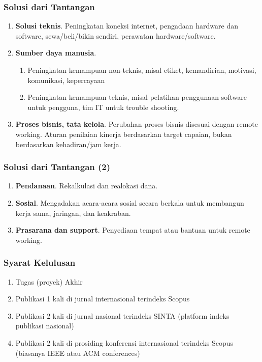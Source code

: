 \documentclass[aspectratio=169, table]{beamer}
\begin{document}
	\begin{frame}
		\frametitle{Solusi dari Tantangan}
		\begin{enumerate}
			\item \textbf{Solusi teknis}. Peningkatan koneksi internet, pengadaan hardware dan software, sewa/beli/bikin sendiri, perawatan hardware/software.
			\item \textbf{Sumber daya manusia}.
			\begin{enumerate}
				\item Peningkatan kemampuan non-teknis, misal etiket, kemandirian, motivasi, komunikasi, kepercayaan
				\item Peningkatan kemampuan teknis, misal pelatihan penggunaan software untuk pengguna, tim IT untuk trouble shooting.
			\end{enumerate}
			\item \textbf{Proses bisnis, tata kelola}. Perubahan proses bisnis disesuai dengan remote working. Aturan penilaian kinerja berdasarkan target capaian, bukan berdasarkan kehadiran/jam kerja.
		\end{enumerate}
	\end{frame}

	\begin{frame}
		\frametitle{Solusi dari Tantangan (2)}
		\begin{enumerate}
			\item \textbf{Pendanaan}. Rekalkulasi dan realokasi dana.
			\item \textbf{Sosial}. Mengadakan acara-acara sosial secara berkala untuk membangun kerja sama, jaringan, dan keakraban.
			\item \textbf{Prasarana dan support}. Penyediaan tempat atau bantuan untuk remote working.
		\end{enumerate}
	\end{frame}

	\begin{frame}
		\frametitle{Syarat Kelulusan}
		\begin{enumerate}
			\item Tugas (proyek) Akhir
			\item Publikasi 1 kali di jurnal internasional terindeks Scopus
			\item Publikasi 2 kali di jurnal nasional terindeks SINTA (platform indeks publikasi nasional)
			\item Publikasi 2 kali di prosiding konferensi internasional terindeks Scopus (biasanya IEEE atau ACM conferences)
		\end{enumerate}
	\end{frame}
\end{document}
